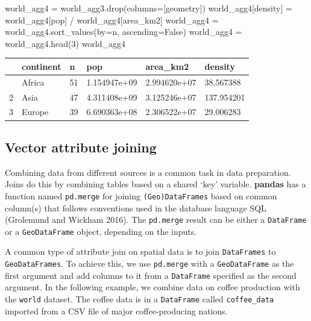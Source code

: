\documentclass[
  letterpaper,
]{krantz}
\newenvironment{Shaded}{\begin{snugshade}}{\end{snugshade}}
\newcommand{\DecValTok}[1]{\textcolor[rgb]{0.68,0.00,0.00}{#1}}
\newcommand{\NormalTok}[1]{\textcolor[rgb]{0.00,0.23,0.31}{#1}}
\newcommand{\OperatorTok}[1]{\textcolor[rgb]{0.37,0.37,0.37}{#1}}
\newcommand{\StringTok}[1]{\textcolor[rgb]{0.13,0.47,0.30}{#1}}
\newcommand{\VariableTok}[1]{\textcolor[rgb]{0.07,0.07,0.07}{#1}}
\begin{document}
\begin{Shaded}
\begin{Highlighting}[]
\NormalTok{world\_agg4 }\OperatorTok{=}\NormalTok{ world\_agg3.drop(columns}\OperatorTok{=}\NormalTok{[}\StringTok{\textquotesingle{}geometry\textquotesingle{}}\NormalTok{])}
\NormalTok{world\_agg4[}\StringTok{\textquotesingle{}density\textquotesingle{}}\NormalTok{] }\OperatorTok{=}\NormalTok{ world\_agg4[}\StringTok{\textquotesingle{}pop\textquotesingle{}}\NormalTok{] }\OperatorTok{/}\NormalTok{ world\_agg4[}\StringTok{\textquotesingle{}area\_km2\textquotesingle{}}\NormalTok{]}
\NormalTok{world\_agg4 }\OperatorTok{=}\NormalTok{ world\_agg4.sort\_values(by}\OperatorTok{=}\StringTok{\textquotesingle{}n\textquotesingle{}}\NormalTok{, ascending}\OperatorTok{=}\VariableTok{False}\NormalTok{)}
\NormalTok{world\_agg4 }\OperatorTok{=}\NormalTok{ world\_agg4.head(}\DecValTok{3}\NormalTok{)}
\NormalTok{world\_agg4}
\end{Highlighting}
\end{Shaded}

\begin{longtable}[]{@{}llllll@{}}
\toprule\noalign{}
& continent & n & pop & area\_km2 & density \\
\midrule\noalign{}
\endhead
\bottomrule\noalign{}
\endlastfoot
0 & Africa & 51 & 1.154947e+09 & 2.994620e+07 & 38.567388 \\
2 & Asia & 47 & 4.311408e+09 & 3.125246e+07 & 137.954201 \\
3 & Europe & 39 & 6.690363e+08 & 2.306522e+07 & 29.006283 \\
\end{longtable}

\subsection{Vector attribute
joining}\label{sec-vector-attribute-joining}

Combining data from different sources is a common task in data
preparation. Joins do this by combining tables based on a shared `key'
variable. \textbf{pandas} has a function named \texttt{pd.merge} for
joining \texttt{(Geo)DataFrames} based on common column(s) that follows
conventions used in the database language SQL (Grolemund and Wickham
2016). The \texttt{pd.merge} result can be either a \texttt{DataFrame}
or a \texttt{GeoDataFrame} object, depending on the inputs.

A common type of attribute join on spatial data is to join
\texttt{DataFrames} to \texttt{GeoDataFrames}. To achieve this, we use
\texttt{pd.merge} with a \texttt{GeoDataFrame} as the first argument and
add columns to it from a \texttt{DataFrame} specified as the second
argument. In the following example, we combine data on coffee production
with the \texttt{world} dataset. The coffee data is in a
\texttt{DataFrame} called \texttt{coffee\_data} imported from a CSV file
of major coffee-producing nations.
\end{document}
